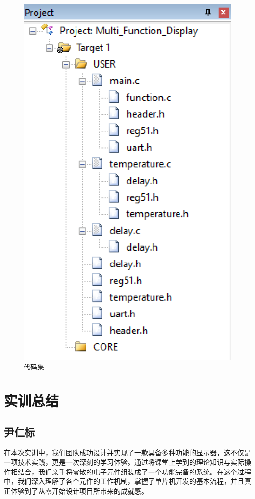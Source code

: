 \documentclass{textreportclass}  %
\begin{document}
	\begin{figure}[htbp]
		\centering
		\includegraphics[scale=0.7]{Fig/代码集.png}
		\caption{代码集}\label{Fig.40}
	\end{figure}
	
	
	
\section{实训总结}					 		%
	\subsection{尹仁标}
	在本次实训中，我们团队成功设计并实现了一款具备多种功能的显示器，这不仅是一项技术实践，更是一次深刻的学习体验。通过将课堂上学到的理论知识与实际操作相结合，我们亲手将零散的电子元件组装成了一个功能完备的系统。在这个过程中，我们深入理解了各个元件的工作机制，掌握了单片机开发的基本流程，并且真正体验到了从零开始设计项目所带来的成就感。
	
\end{document}
